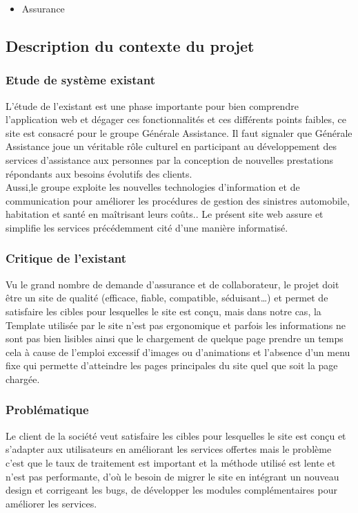 \documentclass{article}
\begin{document}
\begin{itemize}
\item Assurance
\end{itemize}

\subsection{Description du contexte du projet}
\subsubsection{Etude de système existant}
L’étude de l’existant est une phase importante pour bien comprendre l'application web et dégager ces fonctionnalités et ces différents points faibles, ce site est consacré pour le groupe Générale Assistance. Il faut signaler que Générale Assistance joue un véritable rôle culturel en participant au développement des services d’assistance aux personnes par la conception de nouvelles prestations répondants aux besoins évolutifs des clients.\\
Aussi,le groupe exploite les nouvelles technologies d’information et de communication pour améliorer les procédures de gestion des sinistres automobile, habitation et santé en maîtrisant leurs coûts.. Le présent site web assure et simplifie les services précédemment cité d’une manière informatisé.
\subsubsection{Critique de l’existant}
Vu le grand nombre de demande d'assurance et de collaborateur, le projet doit être un site de qualité (efficace, fiable, compatible, séduisant…) et permet de satisfaire les cibles pour lesquelles le site est conçu, mais dans notre cas, la Template utilisée par le site n’est pas ergonomique et parfois les informations ne sont pas bien lisibles ainsi que le chargement de quelque page prendre un temps cela à cause de l'emploi excessif d'images ou d'animations et l’absence d’un menu fixe qui permette d'atteindre les pages principales du site quel que soit la page chargée.
\subsubsection{Problématique}
Le client de la société veut satisfaire les cibles pour lesquelles le site est conçu et s’adapter aux utilisateurs en améliorant les services offertes mais le problème c’est que le taux de traitement est important et la méthode utilisé est lente et n'est pas performante, d’où le besoin de migrer le site en intégrant un nouveau design et corrigeant les bugs, de développer les modules complémentaires pour améliorer les services.
\end{document}
